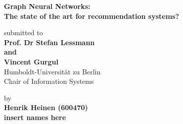 
    \begin{center}
        
    
    {\Large{\bf Graph Neural Networks: \\
    The state of the art for recommendation systems?
    }} \vspace{2cm}


    {\normalsize submitted to}\\\vspace{0.5cm}
    {\normalsize{\bf Prof. Dr Stefan Lessmann}}\\
    {\normalsize{\bf and}}\\
    {\normalsize{\bf Vincent Gurgul }}
    \\\vspace{0.5cm}
    {\normalsize Humboldt-Universit\"at zu Berlin \\
    Chair of Information Systems}


    {\normalsize by \\\vspace{0.5cm}
    {\bf Henrik Heinen (600470)} \\
    {\bf insert names here} \\
    } \vspace{1cm}

    \end{center}



